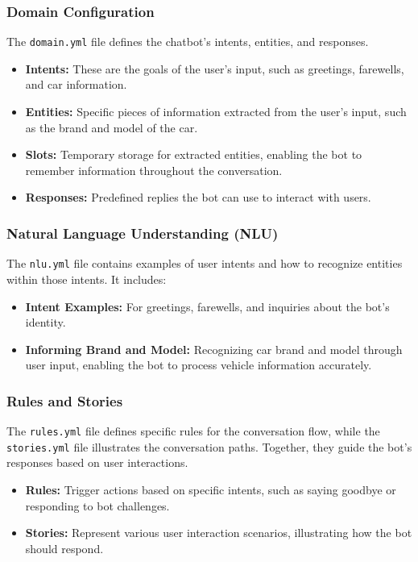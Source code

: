 \documentclass{beamer}
\begin{document}
\begin{frame}
\frametitle{Domain Configuration}
The \texttt{domain.yml} file defines the chatbot's intents, entities, and responses.

\begin{itemize}
    \item \textbf{Intents:} These are the goals of the user's input, such as greetings, farewells, and car information.
    \item \textbf{Entities:} Specific pieces of information extracted from the user's input, such as the brand and model of the car.
    \item \textbf{Slots:} Temporary storage for extracted entities, enabling the bot to remember information throughout the conversation.
    \item \textbf{Responses:} Predefined replies the bot can use to interact with users.
\end{itemize}
\end{frame}

\begin{frame}
\frametitle{Natural Language Understanding (NLU)}
The \texttt{nlu.yml} file contains examples of user intents and how to recognize entities within those intents. It includes:

\begin{itemize}
    \item \textbf{Intent Examples:} For greetings, farewells, and inquiries about the bot's identity.
    \item \textbf{Informing Brand and Model:} Recognizing car brand and model through user input, enabling the bot to process vehicle information accurately.
\end{itemize}
\end{frame}

\begin{frame}
\frametitle{Rules and Stories}
The \texttt{rules.yml} file defines specific rules for the conversation flow, while the \texttt{stories.yml} file illustrates the conversation paths. Together, they guide the bot's responses based on user interactions.

\begin{itemize}
    \item \textbf{Rules:} Trigger actions based on specific intents, such as saying goodbye or responding to bot challenges.
    \item \textbf{Stories:} Represent various user interaction scenarios, illustrating how the bot should respond.
\end{itemize}
\end{frame}
\end{document}
